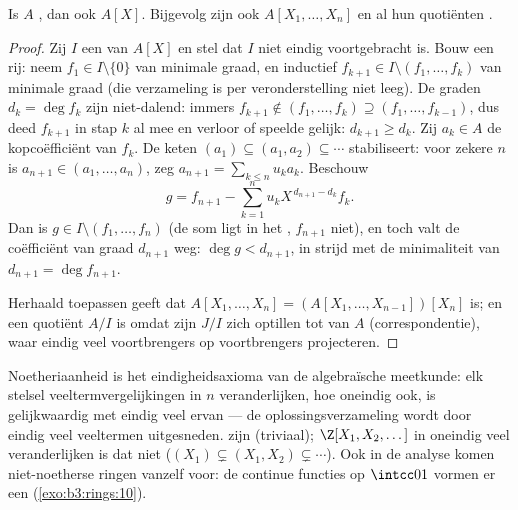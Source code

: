 \begin{theorem}\label{thm:b3:rings:hilbert}
Is $A$ , dan ook $A[X]$. Bijgevolg zijn ook $A[X_1, \dots,
X_n]$ en al hun quotiënten .
\end{theorem}

\begin{proof}
Zij $I$ een  van $A[X]$ en stel dat $I$ niet eindig
voortgebracht is. Bouw een rij: neem $f_1 \in I \setminus \{0\}$
van minimale graad, en inductief $f_{k+1} \in I \setminus (f_1,
\dots, f_k)$ van minimale graad (die verzameling is per
veronderstelling niet leeg). De graden $d_k = \deg f_k$ zijn
niet-dalend: immers $f_{k+1} \notin (f_1,\dots,f_k) \supseteq (f_1,
\dots, f_{k-1})$, dus deed $f_{k+1}$ in stap $k$ al mee en verloor
of speelde gelijk: $d_{k+1} \geq d_k$. Zij $a_k \in A$ de
kopcoëfficiënt van $f_k$. De keten  $(a_1) \subseteq (a_1,
a_2) \subseteq \cdots$ stabiliseert: voor zekere $n$ is $a_{n+1}
\in (a_1, \dots, a_n)$, zeg $a_{n+1} = \sum_{k\leq n} u_k a_k$.
Beschouw
\[
g = f_{n+1} - \sum_{k=1}^{n} u_k X^{\,d_{n+1} - d_k} f_k .
\]
Dan is $g \in I \setminus (f_1, \dots, f_n)$ (de som ligt in het
, $f_{n+1}$ niet), en toch valt de coëfficiënt van graad
$d_{n+1}$ weg: $\deg g < d_{n+1}$, in strijd met de minimaliteit
van $d_{n+1} = \deg f_{n+1}$.

Herhaald toepassen geeft dat $A[X_1, \dots, X_n] = (A[X_1, \dots,
X_{n-1}])[X_n]$  is; en een quotiënt $A/I$ is 
omdat zijn  $J/I$ zich optillen tot  van $A$
(correspondentie), waar eindig veel voortbrengers op voortbrengers
projecteren.
\end{proof}

\begin{remark}\label{rem:b3:rings:noethmeaning}
Noetheriaanheid is het eindigheidsaxioma van de algebraïsche
meetkunde: elk stelsel veeltermvergelijkingen in $n$
veranderlijken, hoe oneindig ook, is gelijkwaardig met eindig veel
ervan --- de oplossingsverzameling wordt door eindig veel
veeltermen uitgesneden.  zijn 
(triviaal); $\Z[X_1, X_2, \dots]$ in oneindig veel veranderlijken
is dat niet ($(X_1) \subsetneq (X_1, X_2) \subsetneq \cdots$). Ook
in de analyse komen niet-noetherse ringen vanzelf voor: de continue
functies op $\intcc01$ vormen er een (\cref{exo:b3:rings:10}).
\end{remark}


